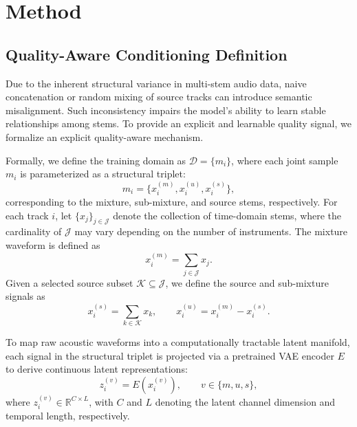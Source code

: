 \documentclass[lettersize,journal]{IEEEtran}
\begin{document}
\section{Method}

\subsection{Quality-Aware Conditioning Definition}
Due to the inherent structural variance in multi-stem audio data, naive concatenation or random mixing of source tracks can introduce semantic misalignment. Such inconsistency impairs the model's ability to learn stable relationships among stems. To provide an explicit and learnable quality signal, we formalize an explicit quality-aware mechanism.

Formally, we define the training domain as $\mathcal{D}=\{\mathit{m}_i\}$, where each joint sample $\mathit{m}_i$ is parameterized as a structural triplet:
  \[
    \mathit{m}_i=\{x_i^{(m)},x_i^{(u)},x_i^{(s)}\},
  \]
corresponding to the mixture, sub-mixture, and source stems, respectively. For each track $i$, let
  $\{x_j\}_{j\in\mathcal{J}}$ 
denote the collection of time-domain stems, where the cardinality of $\mathcal{J}$ may vary depending on the number of instruments. The mixture waveform is defined as
  \begin{equation}
    x_i^{(m)}=\sum_{j\in\mathcal{J}}x_j.
  \end{equation}
Given a selected source subset $\mathcal{K}\subseteq\mathcal{J}$, we define the source and sub-mixture signals as
  \begin{equation}
    x_i^{(s)}=\sum_{k\in\mathcal{K}}x_k,\qquad
    x_i^{(u)}=x_i^{(m)}-x_i^{(s)}.
  \end{equation}

To map raw acoustic waveforms into a computationally tractable latent manifold, each signal in the structural triplet is projected via a pretrained VAE encoder $E$ to derive continuous latent representations:
  \begin{equation}
    z_i^{(v)}=E(x_i^{(v)}),\qquad v\in\{m,u,s\},
  \end{equation}
where $z_i^{(v)}\in\mathbb{R}^{C\times L}$, with $C$ and $L$ denoting the latent channel dimension and temporal length, respectively.
\end{document}
